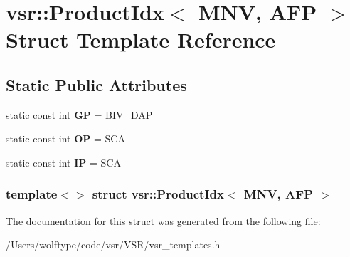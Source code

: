 \hypertarget{structvsr_1_1_product_idx_3_01_m_n_v_00_01_a_f_p_01_4}{\section{vsr\-:\-:Product\-Idx$<$ M\-N\-V, A\-F\-P $>$ Struct Template Reference}
\label{structvsr_1_1_product_idx_3_01_m_n_v_00_01_a_f_p_01_4}
}
\subsection*{Static Public Attributes}
\begin{DoxyCompactItemize}
\item 
\hypertarget{structvsr_1_1_product_idx_3_01_m_n_v_00_01_a_f_p_01_4_af29343fd05c6a1514e396030cf001ced}{static const int {\bfseries G\-P} = B\-I\-V\-\_\-\-D\-A\-P}\label{structvsr_1_1_product_idx_3_01_m_n_v_00_01_a_f_p_01_4_af29343fd05c6a1514e396030cf001ced}

\item 
\hypertarget{structvsr_1_1_product_idx_3_01_m_n_v_00_01_a_f_p_01_4_a20e33dbfe4f0ce53f02fa91c7100bd5f}{static const int {\bfseries O\-P} = S\-C\-A}\label{structvsr_1_1_product_idx_3_01_m_n_v_00_01_a_f_p_01_4_a20e33dbfe4f0ce53f02fa91c7100bd5f}

\item 
\hypertarget{structvsr_1_1_product_idx_3_01_m_n_v_00_01_a_f_p_01_4_a3239708806cc3143c03edd5687edf250}{static const int {\bfseries I\-P} = S\-C\-A}\label{structvsr_1_1_product_idx_3_01_m_n_v_00_01_a_f_p_01_4_a3239708806cc3143c03edd5687edf250}

\end{DoxyCompactItemize}
\subsubsection*{template$<$$>$ struct vsr\-::\-Product\-Idx$<$ M\-N\-V, A\-F\-P $>$}



The documentation for this struct was generated from the following file\-:\begin{DoxyCompactItemize}
\item 
/\-Users/wolftype/code/vsr/\-V\-S\-R/vsr\-\_\-templates.\-h\end{DoxyCompactItemize}
